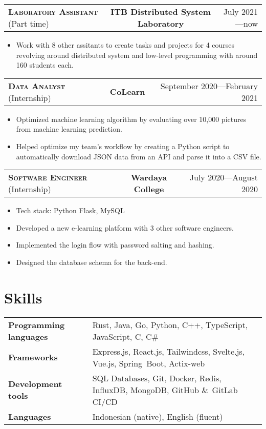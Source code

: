 \documentclass[10pt]{article}
\makeatletter
\newcommand{\workExpVspace}{1em}
\newcommand{\workExp}[6]{
    \noindent \begin{tabularx}{\textwidth}{@{}X c|r}
        \textbf{\textsc{#5}} (#2) & \textbf{#1} & #3---#4
    \end{tabularx}

    {#6}
    \vspace{\workExpVspace}
}
\makeatother
\begin{document}
\workExp
    {ITB Distributed System Laboratory}
    {Part time}
    {July 2021}
    {now}
    {Laboratory Assistant}
    {
        \begin{itemize}
            \item Work with 8 other assitants to create tasks and projects for 4 courses revolving
                around distributed system and low-level programming with around 160 students each.
        \end{itemize}
    }

\workExp
    {CoLearn}
    {Internship}
    {September 2020}
    {February 2021}
    {Data Analyst}
    {
        \begin{itemize}
            \item Optimized machine learning algorithm by evaluating over 10,000 pictures from
                machine learning prediction.
            \item Helped optimize my team's workflow by creating a Python script to automatically
                download JSON data from an API and parse it into a CSV file.
        \end{itemize}
    }

\workExp
    {Wardaya College}
    {Internship}
    {July 2020}
    {August 2020}
    {Software Engineer}
    {
        \begin{itemize}
            \item Tech stack: Python Flask, MySQL
            \item Developed a new e-learning platform with 3 other software engineers.
            \item Implemented the login flow with password salting and hashing.
            \item Designed the database schema for the back-end.
        \end{itemize}
    }

\section{Skills}

\begin{tabularx}{\textwidth}{@{}X l}
\textbf{Programming languages} & Rust, Java, Go, Python, C++, TypeScript, JavaScript, C, C\# \\
\textbf{Frameworks}            & Express.js, React.js, Tailwindcss, Svelte.js, Vue.js, Spring\
                                 Boot, Actix-web \\
\textbf{Development tools}     & SQL Databases, Git, Docker, Redis, InfluxDB, MongoDB, GitHub \&\
                                 GitLab CI/CD \\
\textbf{Languages}             & Indonesian (native), English (fluent)
\end{tabularx}
\end{document}
